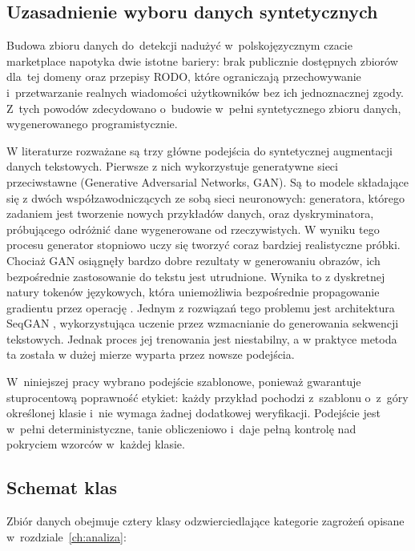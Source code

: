 \subsection{Uzasadnienie wyboru danych syntetycznych}
\label{sec:dataset-geneza}

Budowa zbioru danych do~detekcji nadużyć w~polskojęzycznym czacie marketplace
napotyka dwie istotne bariery: brak publicznie dostępnych zbiorów dla~tej domeny
oraz przepisy RODO, które ograniczają przechowywanie i~przetwarzanie realnych
wiadomości użytkowników bez ich jednoznacznej zgody. Z~tych powodów zdecydowano
o~budowie w~pełni syntetycznego zbioru danych, wygenerowanego programistycznie.

W literaturze rozważane są trzy główne podejścia do syntetycznej augmentacji danych tekstowych. Pierwsze z nich wykorzystuje generatywne sieci przeciwstawne (Generative Adversarial Networks, GAN). Są to modele składające się z dwóch współzawodniczących ze sobą sieci neuronowych: generatora, którego zadaniem jest tworzenie nowych przykładów danych, oraz dyskryminatora, próbującego odróżnić dane wygenerowane od rzeczywistych. W wyniku tego procesu generator stopniowo uczy się tworzyć coraz bardziej realistyczne próbki. Chociaż GAN osiągnęły bardzo dobre rezultaty w generowaniu obrazów, ich bezpośrednie zastosowanie do tekstu jest utrudnione. Wynika to z dyskretnej natury tokenów językowych, która uniemożliwia bezpośrednie propagowanie gradientu przez operację . Jednym z rozwiązań tego problemu jest architektura SeqGAN \cite{bib:seqgan}, wykorzystująca uczenie przez wzmacnianie do generowania sekwencji tekstowych. Jednak proces jej trenowania jest niestabilny, a w praktyce metoda ta została w dużej mierze wyparta przez nowsze podejścia.

W~niniejszej pracy wybrano podejście szablonowe, ponieważ gwarantuje
stuprocentową poprawność etykiet: każdy przykład pochodzi z~szablonu
o~z~góry określonej klasie i~nie wymaga żadnej dodatkowej weryfikacji. Podejście
jest w~pełni deterministyczne, tanie
obliczeniowo i~daje pełną kontrolę nad pokryciem wzorców w~każdej klasie.

\subsection{Schemat klas}
\label{sec:dataset-klasy}

Zbiór danych obejmuje cztery klasy odzwierciedlające kategorie zagrożeń
opisane w~rozdziale~\ref{ch:analiza}:

